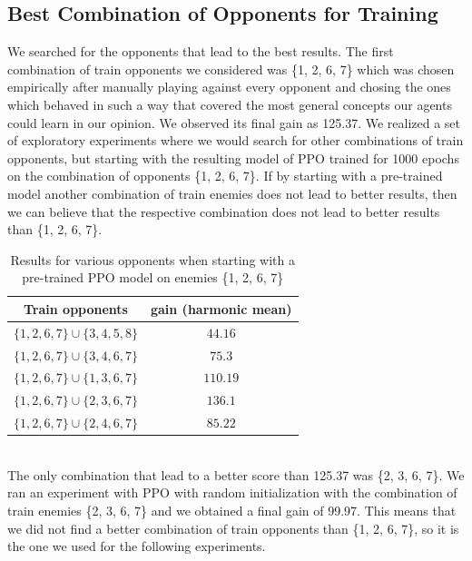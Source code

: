 \documentclass[conference]{IEEEtran}
\begin{document}
    \subsection{Best Combination of Opponents for Training}\label{subsec:best-combination-of-opponents-for-training}
    We searched for the opponents that lead to the best results.
    The first combination of train opponents we considered was \{1, 2, 6, 7\} which was chosen empirically after manually playing against every opponent and chosing the ones which behaved in such a way that covered the most general concepts our agents could learn in our opinion.
    We observed its final gain as 125.37.
    We realized a set of exploratory experiments where we would search for other combinations of train opponents,
    but starting with the resulting model of PPO trained for 1000 epochs on the combination of opponents \{1, 2, 6, 7\}.
    If by starting with a pre-trained model another combination of train enemies does not lead to better results,
    then we can believe that the respective combination does not lead to better results than \{1, 2, 6, 7\}.
    \begin{table}[htbp]
        \caption{Results for various opponents when starting with a pre-trained PPO model on enemies \{1, 2, 6, 7\}}
        \begin{center}
            \begin{tabular}{|c|c|}
                \hline
                \textbf{Train opponents}&{\textbf{gain (harmonic mean)}} \\
                \hline
                $\{1, 2, 6, 7\} \cup \{3, 4, 5, 8\}$ & $44.16$ \\
                $\{1, 2, 6, 7\} \cup \{3, 4, 6, 7\}$ & $75.3$ \\
                $\{1, 2, 6, 7\} \cup \{1, 3, 6, 7\}$ & $110.19$ \\
                $\{1, 2, 6, 7\} \cup \{2, 3, 6, 7\}$ & $136.1$ \\
                $\{1, 2, 6, 7\} \cup \{2, 4, 6, 7\}$ & $85.22$ \\
                \hline
            \end{tabular}
            \label{table:variations_of_opponents}
        \end{center}
    \end{table}
    \\
    The only combination that lead to a better score than 125.37 was \{2, 3, 6, 7\}.
    We ran an experiment with PPO with random initialization with the combination of train enemies \{2, 3, 6, 7\} and
    we obtained a final gain of 99.97.
    This means that we did not find a better combination of train opponents than \{1, 2, 6, 7\}, so it is the one
    we used for the following experiments.
\end{document}
